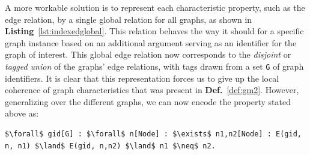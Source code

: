 A more workable solution is to represent each characteristic property, such as the edge relation, by a single global relation for all graphs, as shown in \textbf{Listing}~\ref{lst:indexedglobal}.
This relation behaves the way it should for a specific graph instance based on an additional argument serving as an identifier for the graph of interest.
This global edge relation now corresponds to the \emph{disjoint} or \emph{tagged union} of the graphs' edge relations, with tags drawn from a set \lstinline{G} of graph identifiers.
It is clear that this representation forces us to give up the local coherence of graph characteristics that was present in \textbf{Def.}~\ref{def:gm2}.
%
However, generalizing over the different graphs, we can now encode the property stated above as:
\begin{center}
\begin{minipage}{1.02\linewidth}
\vspace{-2em}
\begin{lstlisting}[style=small,mathescape]
$\forall$ gid[G] : $\forall$ n[Node] : $\exists$ n1,n2[Node] : E(gid, n, n1) $\land$ E(gid, n,n2) $\land$ n1 $\neq$ n2.
\end{lstlisting}
\end{minipage}
\vspace{-3em}
\end{center}

